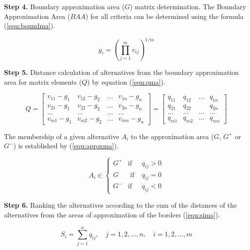 \noindent \textbf{Step 4.} Boundary approximation area ($G$) matrix determination. The Boundary Approximation Area ($BAA$) for all criteria can be determined using the formula (\ref{equ:boundma}).


\begin{equation}
\label{equ:boundma}
g_{i}=\left(\prod_{j=1}^{m} v_{i j}\right)^{1 / m}
\end{equation}


\noindent \textbf{Step 5.} Distance calculation of alternatives from the boundary approximation area for matrix elements ($Q$) by equation (\ref{equ:qma}).

\begin{equation}
\label{equ:qma}
Q=\left[\begin{array}{cccc}
v_{11}-g_{1} & v_{12}-g_{2} & \ldots & v_{1 n}-g_{n} \\
v_{21}-g_{1} & v_{22}-g_{2} & \ldots & v_{2 n}-g_{n} \\
\ldots & \ldots & \ldots & \ldots \\
v_{m 1}-g_{1} & v_{m 2}-g_{2} & \ldots & v_{m n}-g_{n}
\end{array}\right]=\left[\begin{array}{cccc}
q_{11} & q_{12} & \ldots & q_{1 n} \\
q_{21} & q_{22} & & q_{2 n} \\
\ldots & \ldots & \ldots & \ldots \\
q_{m 1} & q_{m 2} & \ldots & q_{m n}
\end{array}\right]
\end{equation}

The membership of a given alternative $A_i$ to the approximation area ($G$, $G^{+}$ or $G^{-}$) is established by (\ref{equ:aproxma}).

\begin{equation}
\label{equ:aproxma}
A_{i} \in\left\{\begin{array}{lll}
G^{+} & \text {if } & q_{i j}>0 \\
G & \text { if } & q_{i j}=0 \\
G^{-} & \text {if } & q_{i j}<0
\end{array}\right.
\end{equation}

\noindent \textbf{Step 6.} Ranking the alternatives according to the sum of the distances of the alternatives from the areas of approximation of the borders (\ref{equ:sima}).

\begin{equation}
\label{equ:sima}
S_{i}=\sum_{j=1}^{n} q_{i j}, \quad j=1,2, \ldots, n, \quad i=1,2, \ldots, m
\end{equation}
